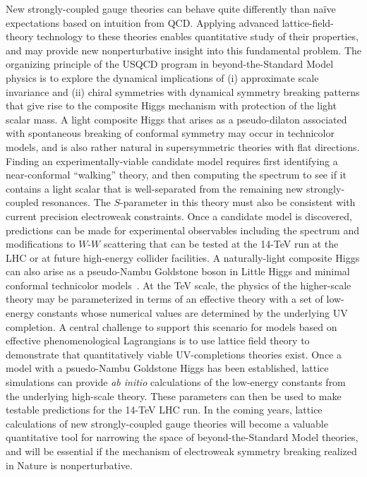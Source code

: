 \begin{itemize}
New strongly-coupled gauge theories can behave quite differently than
na{\"i}ve expectations based on intuition from QCD.  Applying advanced
lattice-field-theory technology to these theories enables quantitative study
of their properties, and may provide new nonperturbative insight into this
fundamental problem.  The organizing principle of the USQCD program in
beyond-the-Standard Model physics is to explore the dynamical implications of
(i) approximate scale invariance and (ii) chiral symmetries with dynamical
symmetry breaking patterns that give rise to the composite Higgs mechanism
with protection of the light scalar mass.  A light composite Higgs that arises
as a pseudo-dilaton associated with spontaneous breaking of conformal symmetry
may occur in technicolor models, and is also rather natural in supersymmetric
theories with flat directions.  Finding an experimentally-viable candidate
model requires first identifying a near-conformal ``walking'' theory, and then
computing the spectrum to see if it contains a light scalar that is
well-separated from the remaining new strongly-coupled resonances.  The
$S$-parameter in this theory must also be consistent with current precision
electroweak constraints.  Once a candidate model is discovered, predictions
can be made for experimental observables including the spectrum and
modifications to $W$-$W$ scattering that can be tested at the 14-TeV run at
the LHC or at future high-energy collider facilities.  A naturally-light
composite Higgs can also arise as a pseudo-Nambu Goldstone boson in Little
Higgs and minimal conformal technicolor
models~\cite{ArkaniHamed:2002qy,Galloway:2010bp}.  At the TeV scale, the
physics of the higher-scale theory may be parameterized in terms of an
effective theory with a set of low-energy constants whose numerical values are
determined by the underlying UV completion.  A central challenge to support
this scenario for models based on effective phenomenological Lagrangians is to
use lattice field theory to demonstrate that quantitatively viable
UV-completions theories exist.  Once a model with a psuedo-Nambu Goldstone
Higgs has been established, lattice simulations can provide {\it ab initio}
calculations of the low-energy constants from the underlying high-scale
theory.  These parameters can then be used to make testable predictions for
the 14-TeV LHC run.  In the coming years, lattice calculations of new
strongly-coupled gauge theories will become a valuable quantitative tool for
narrowing the space of beyond-the-Standard Model theories, and will be
essential if the mechanism of electroweak symmetry breaking realized in Nature
is nonperturbative.


\end{itemize}
